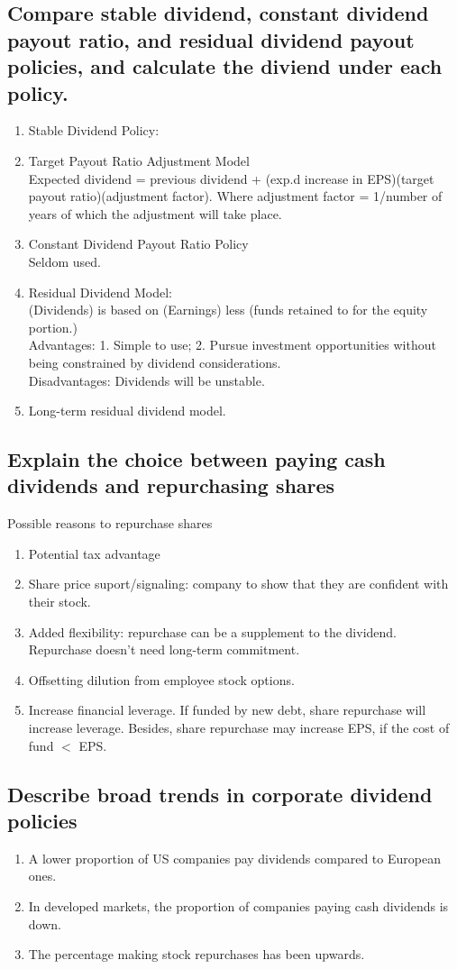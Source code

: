 \documentclass{article}
\newcommand{\be}{\begin{enumerate}}
\newcommand{\ee}{\end{enumerate}}
\begin{document}
\subsection{Compare stable dividend, constant dividend payout ratio, and residual dividend
payout policies, and calculate the diviend under each policy.}
\be
    \item Stable Dividend Policy:
    \item Target Payout Ratio Adjustment Model
        \\ Expected dividend = previous dividend + (exp.d increase in EPS)(target payout ratio)(adjustment factor).
        Where adjustment factor = 1/number of years of which the adjustment will take place.
    \item Constant Dividend Payout Ratio Policy
        \\ Seldom used.
    \item Residual Dividend Model:
        \\ (Dividends) is based on (Earnings) less (funds retained to for the equity portion.) 
        \\ Advantages: 1. Simple to use; 2. Pursue investment opportunities without
        being constrained by dividend considerations.
        \\ Disadvantages: Dividends will be unstable.
    \item Long-term residual dividend model.
\ee
\subsection{Explain the choice between paying cash dividends and repurchasing shares}
Possible reasons to repurchase shares
\be
    \item Potential tax advantage
    \item Share price suport/signaling: company to show that they are confident with
        their stock.
    \item Added flexibility: repurchase can be a supplement to the dividend. Repurchase
        doesn't need long-term commitment.
    \item Offsetting dilution from employee stock options. 
    \item Increase financial leverage. If funded by new debt, share repurchase will 
        increase leverage. Besides, share repurchase may increase EPS, if the cost
        of fund $<$ EPS. 
\ee
\subsection{Describe broad trends in corporate dividend policies}
\be
    \item A lower proportion of US companies pay dividends compared to European ones.
    \item In developed markets, the proportion of companies paying cash dividends is down.
    \item The percentage making stock repurchases has been upwards.
\ee
\end{document}
